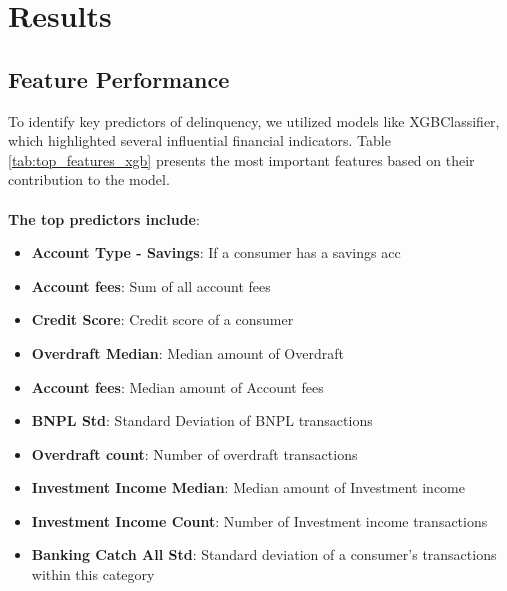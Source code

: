 \documentclass[12pt,letterpaper]{article}
\begin{document}
\section{Results}

\subsection{Feature Performance}
To identify key predictors of delinquency, we utilized models like XGBClassifier, which highlighted several influential financial indicators. Table \ref{tab:top_features_xgb} presents the most important features based on their contribution to the model. \\
\\
\textbf{The top predictors include}: \\

\begin{itemize}
    \item \textbf{Account Type - Savings}: If a consumer has a savings acc
    \item \textbf{Account fees}: Sum of all account fees
    \item \textbf{Credit Score}: Credit score of a consumer
    \item \textbf{Overdraft Median}: Median amount of Overdraft
    \item \textbf{Account fees}: Median amount of Account fees
    \item \textbf{BNPL Std}: Standard Deviation of BNPL transactions
    \item \textbf{Overdraft count}: Number of overdraft transactions
    \item \textbf{Investment Income Median}: Median amount of Investment income
    \item \textbf{Investment Income Count}: Number of Investment income transactions
    \item \textbf{Banking Catch All Std}: Standard deviation of a consumer's transactions within this category
\end{itemize}
\end{document}

